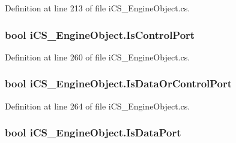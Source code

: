 Definition at line 213 of file i\+C\+S\+\_\+\+Engine\+Object.\+cs.

\hypertarget{classi_c_s___engine_object_aaa43ea7ff4afc14d4c731babbd8b74bd}{
\subsubsection[{Is\+Control\+Port}]{\setlength{\rightskip}{0pt plus 5cm}bool i\+C\+S\+\_\+\+Engine\+Object.\+Is\+Control\+Port\hspace{0.3cm}{\ttfamily [get]}}}\label{classi_c_s___engine_object_aaa43ea7ff4afc14d4c731babbd8b74bd}


Definition at line 260 of file i\+C\+S\+\_\+\+Engine\+Object.\+cs.

\hypertarget{classi_c_s___engine_object_a93a2bf3a50fedf1b175d1a680f803772}{
\subsubsection[{Is\+Data\+Or\+Control\+Port}]{\setlength{\rightskip}{0pt plus 5cm}bool i\+C\+S\+\_\+\+Engine\+Object.\+Is\+Data\+Or\+Control\+Port\hspace{0.3cm}{\ttfamily [get]}}}\label{classi_c_s___engine_object_a93a2bf3a50fedf1b175d1a680f803772}


Definition at line 264 of file i\+C\+S\+\_\+\+Engine\+Object.\+cs.

\hypertarget{classi_c_s___engine_object_ab0c905172cac77c12fa1ee1fbc2f63d1}{
\subsubsection[{Is\+Data\+Port}]{\setlength{\rightskip}{0pt plus 5cm}bool i\+C\+S\+\_\+\+Engine\+Object.\+Is\+Data\+Port\hspace{0.3cm}{\ttfamily [get]}}}\label{classi_c_s___engine_object_ab0c905172cac77c12fa1ee1fbc2f63d1}


